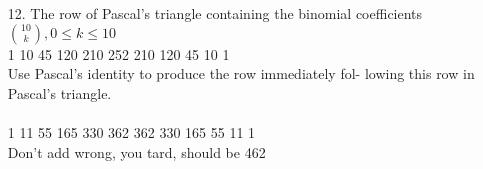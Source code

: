 \begin{itemize}
\item[12.]  The row of Pascal’s triangle containing the binomial coefficients ${10 \choose k}, 0 \leq k \leq 10$ \\
1 10 45 120 210 252 210 120 45 10 1 \\
Use Pascal’s identity to produce the row immediately fol-
lowing this row in Pascal’s triangle. \\
\answer \\
1 11 55 165 330 362 362 330 165 55 11 1 \\
{\color{red} Don't add wrong, you tard, should be 462}

\end{itemize}